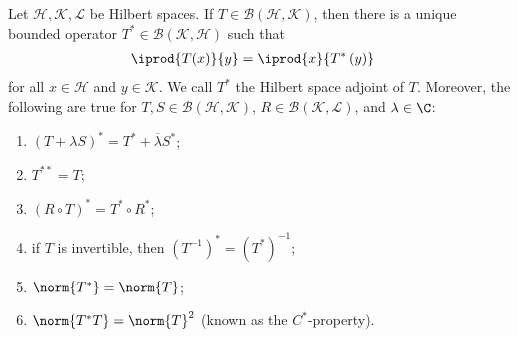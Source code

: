 \documentclass[10pt]{mypackage}
\begin{document}
\begin{theorem}
  Let $\mathcal{H}, \mathcal{K},\mathcal{L}$ be Hilbert spaces. If $T\in \mathcal{B}\left(\mathcal{H},\mathcal{K}\right)$, then there is a unique bounded operator $T^{\ast}\in \mathcal{B}\left(\mathcal{K},\mathcal{H}\right)$ such that 
  \begin{align*}
    \iprod{T(x)}{y} &= \iprod{x}{T^{\ast}\left(y\right)}
  \end{align*}
  for all $x\in \mathcal{H}$ and $y\in \mathcal{K}$. We call $T^{\ast}$ the Hilbert space adjoint of $T$. Moreover, the following are true for $T,S\in \mathcal{B}\left(\mathcal{H},\mathcal{K}\right)$, $R\in \mathcal{B}\left(\mathcal{K},\mathcal{L}\right)$, and $\lambda \in \C$:
  \begin{enumerate}[(1)]
    \item $\left(T + \lambda S\right)^{\ast} = T^{\ast} + \overline{\lambda}S^{\ast}$;
    \item $T^{\ast\ast} = T$;
    \item $\left(R\circ T\right)^{\ast} = T^{\ast}\circ R^{\ast}$;
    \item if $T$ is invertible, then $\left(T^{-1}\right)^{\ast} = \left(T^{\ast}\right)^{-1}$;
    \item $\norm{T^{\ast}} = \norm{T}$;
    \item $\norm{T^{\ast}T} = \norm{T}^2$ (known as the $C^{\ast}$-property).
  \end{enumerate}
\end{theorem}
\end{document}
